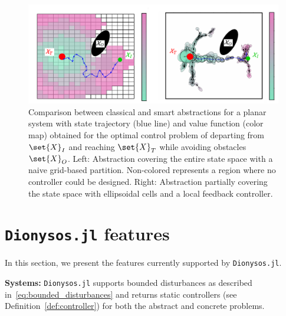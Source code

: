 \documentclass{juliacon}
\begin{document}
\begin{figure}[t]
\centerline{\includegraphics[width=\linewidth, trim=17 0 10 0, clip]{Figures/Abstraction/Classical-vs-smart.pdf}}
\caption{Comparison between classical and smart abstractions for a planar system with state trajectory (blue line) and value function (color map) obtained for the optimal control problem of departing from $\set{X}_I$ and reaching $\set{X}_T$ while avoiding obstacles~$\set{X}_O$. 
Left: Abstraction covering the entire state space with a naive grid-based partition. Non-colored represents a region where no controller could be designed. Right: Abstraction partially covering the state space with ellipsoidal cells and a local feedback controller.}
	\label{fig:Full-vs-Partial}
\end{figure}




\section{\texttt{Dionysos.jl} features}
\label{sec:functionalities}
In this section, we present the features currently supported by \texttt{Dionysos.jl}.

\vskip 6pt
\textbf{Systems:} 
\texttt{Dionysos.jl} supports bounded disturbances as described in~\eqref{eq:bounded_disturbances} and returns static controllers (see Definition~\ref{def:controller}) for both the abstract and concrete problems.
\end{document}
